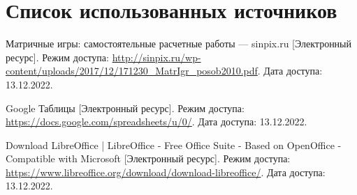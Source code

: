 
\begingroup
  \section*{Список использованных источников}

  \renewcommand{\addcontentsline}[3]{}%
  \renewcommand{\section}[2]{}%

  \begin{thebibliography}{}
    Матричные игры: самостоятельные расчетные работы — sinpix.ru
    [Электронный ресурс].
    Режим доступа: \url{http://sinpix.ru/wp-content/uploads/2017/12/171230_MatrIgr_posob2010.pdf}.
    Дата доступа: 13.12.2022.

    Google Таблицы
    [Электронный ресурс].
    Режим доступа: \url{https://docs.google.com/spreadsheets/u/0/}.
    Дата доступа: 13.12.2022.

    Download LibreOffice | LibreOffice - Free Office Suite - Based on OpenOffice - Compatible with Microsoft
    [Электронный ресурс].
    Режим доступа: \url{https://www.libreoffice.org/download/download-libreoffice/}.
    Дата доступа: 13.12.2022.
  \end{thebibliography}
\endgroup

\newpage

\begingroup
  \section*{Литература, чтобы писать в \TeX~(\LaTeX)}
  \addcontentsline{toc}{section}{Литература, чтобы писать в LaTeX}

  \renewcommand{\addcontentsline}[3]{}%
  \renewcommand{\section}[2]{}%

